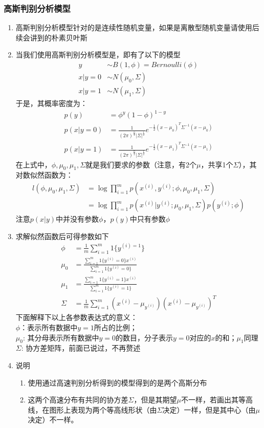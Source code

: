 \subsubsection{高斯判别分析模型}
\begin{enumerate}
	\item 高斯判别分析模型针对的是连续性随机变量，如果是离散型随机变量请使用后续会讲到的朴素贝叶斯
	\item 当我们使用高斯判别分析模型是，即有了以下的模型
	\begin{align}
		y & \sim B(1, \phi) = Bernoulli(\phi) \\
		x|y=0 &\sim N(\mu_0, \Sigma) \\
		x|y=1 &\sim N(\mu_1, \Sigma)
	\end{align}
	于是，其概率密度为：
	\begin{align}
		p(y) &= \phi^y(1-\phi)^{1-y} \\
		p(x|y=0) &= \frac{1}{(2\pi)^{\frac{n}{2}}|\Sigma|^\frac{1}{2}}e^{-\frac{1}{2}(x-\mu_0)^T\Sigma^{-1}(x-\mu_0)} \\
		p(x|y=1) &= \frac{1}{(2\pi)^{\frac{n}{2}}|\Sigma|^\frac{1}{2}}e^{-\frac{1}{2}(x-\mu_1)^T\Sigma^{-1}(x-\mu_1)}
	\end{align}
	在上式中，$\phi, \mu_0, \mu_1, \Sigma$就是我们要求的参数（注意，有2个$\mu$，共享1个$\Sigma$），其对数似然函数为：
	\begin{align}
		l(\phi, \mu_0, \mu_1, \Sigma) &= \log \prod_{i=1}^{m} p\left(x^{(i)}, y^{(i)}; \phi, \mu_0, \mu_1, \Sigma\right) \\
		&= \log \prod_{i=1}^{m} p\left(x^{(i)}|y^{(i)}; \mu_0, \mu_1, \Sigma\right)p\left(y^{(i)};\phi\right)
	\end{align}
	注意$p(x|y)$中并没有参数$\phi$，$p(y)$中只有参数$\phi$
	\item 求解似然函数后可得参数如下
	\begin{align}
		\phi &= \frac{1}{m} \sum_{i=1}^{m}1\{y^{(i)=1}\} \\
		\mu_0 &= \frac{\sum_{i=1}^{m}1\{y^{(i)}=0\}x^{(i)}}{\sum_{i=1}^{m}1\{y^{(i)}=0\}} \\
		\mu_1 &= \frac{\sum_{i=1}^{m}1\{y^{(i)}=1\}x^{(i)}}{\sum_{i=1}^{m}1\{y^{(i)}=1\}} \\
		\Sigma &= \frac{1}{m}\sum_{i=1}^{m}\left(x^{(i)}-\mu_{y^{(i)}}\right)\left(x^{(i)}-\mu_{y^{(i)}}\right)^T
	\end{align}
	下面解释下以上各参数表达式的意义： \\
	$\phi$：表示所有数据中$y=1$所占的比例； \\
	$\mu_0$: 其分母表示所有数据中$y=0$的数目，分子表示$y=0$对应的$x$的和；$\mu_1$同理 \\
	$\Sigma$: 协方差矩阵，前面已说过，不再赘述
	\item 说明
	\begin{enumerate}
		\item 使用通过高速判别分析得到的模型得到的是两个高斯分布
		\item 这两个高速分布有共同的协方差$\Sigma$，但是其期望$\mu$不一样，若画出其等高线，在图形上表现为两个等高线形状（由$\Sigma$决定）一样，但是其中心（由$\mu$决定）不一样。
	\end{enumerate}
\end{enumerate}


